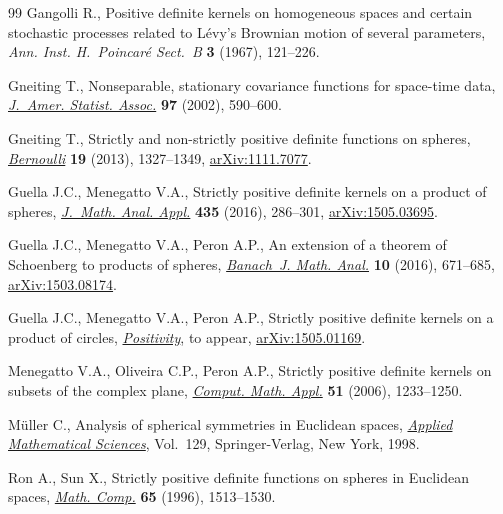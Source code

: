 \documentclass[pdftex]{sigma}
\numberwithin{equation}{section}
\begin{document}
\begin{thebibliography}{99}
Gangolli R., Positive def\/inite kernels on homogeneous spaces and certain
 stochastic processes related to {L}\'evy's {B}rownian motion of several
 parameters, \textit{Ann. Inst. H.~Poincar\'e Sect.~B} \textbf{3} (1967),
 121--226.

Gneiting T., Nonseparable, stationary covariance functions for space-time data,
 \href{http://dx.doi.org/10.1198/016214502760047113}{\textit{J.~Amer. Statist. Assoc.}} \textbf{97} (2002), 590--600.

Gneiting T., Strictly and non-strictly positive def\/inite functions on spheres,
 \href{http://dx.doi.org/10.3150/12-BEJSP06}{\textit{Bernoulli}} \textbf{19} (2013), 1327--1349, \href{http://arxiv.org/abs/1111.7077}{arXiv:1111.7077}.

Guella J.C., Menegatto V.A., Strictly positive def\/inite kernels on a product of
 spheres, \href{http://dx.doi.org/10.1016/j.jmaa.2015.10.026}{\textit{J.~Math. Anal. Appl.}} \textbf{435} (2016), 286--301,
 \href{http://arxiv.org/abs/1505.03695}{arXiv:1505.03695}.

Guella J.C., Menegatto V.A., Peron A.P., An extension of a theorem of
 {S}choenberg to products of spheres, \href{http://dx.doi.org/10.1215/17358787-3649260}{\textit{Banach~J. Math. Anal.}}
 \textbf{10} (2016), 671--685, \href{http://arxiv.org/abs/1503.08174}{arXiv:1503.08174}.

Guella J.C., Menegatto V.A., Peron A.P., Strictly positive def\/inite kernels on
 a product of circles, \href{http://dx.doi.org/10.1007/s11117-016-0425-1}{\textit{Positivity}}, {t}o appear, \href{http://arxiv.org/abs/1505.01169}{arXiv:1505.01169}.


Menegatto V.A., Oliveira C.P., Peron A.P., Strictly positive def\/inite kernels
 on subsets of the complex plane, \href{http://dx.doi.org/10.1016/j.camwa.2006.04.006}{\textit{Comput. Math. Appl.}} \textbf{51}
 (2006), 1233--1250.

M{\"u}ller C., Analysis of spherical symmetries in {E}uclidean spaces,
 \href{http://dx.doi.org/10.1007/978-1-4612-0581-4}{\textit{Applied Mathematical Sciences}}, Vol.~129, Springer-Verlag, New York,
 1998.

Ron A., Sun X., Strictly positive def\/inite functions on spheres in {E}uclidean
 spaces, \href{http://dx.doi.org/10.1090/S0025-5718-96-00780-6}{\textit{Math. Comp.}} \textbf{65} (1996), 1513--1530.


\end{thebibliography}
\end{document}
